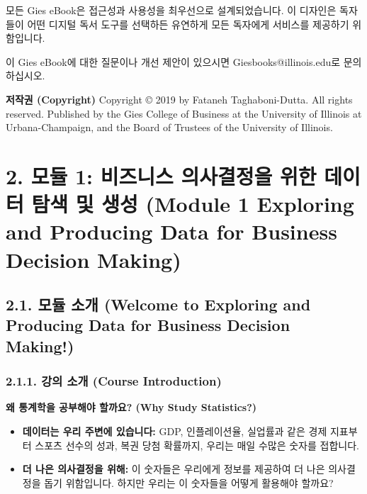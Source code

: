 \documentclass[11pt,a4paper]{article}
\theoremstyle{definition}
\begin{document}
모든 Gies eBook은 접근성과 사용성을 최우선으로 설계되었습니다. 이 디자인은 독자들이 어떤 디지털 독서 도구를 선택하든 유연하게 모든 독자에게 서비스를 제공하기 위함입니다.

이 Gies eBook에 대한 질문이나 개선 제안이 있으시면 Giesbooks@illinois.edu로 문의하십시오.

\textbf{저작권 (Copyright)}
Copyright © 2019 by Fataneh Taghaboni-Dutta. All rights reserved.
Published by the Gies College of Business at the University of Illinois at Urbana-Champaign, and the Board of Trustees of the University of Illinois.

\newpage
\section{2. 모듈 1: 비즈니스 의사결정을 위한 데이터 탐색 및 생성 (Module 1 Exploring and Producing Data for Business Decision Making)}

\subsection{2.1. 모듈 소개 (Welcome to Exploring and Producing Data for Business Decision Making!)}

\subsubsection{2.1.1. 강의 소개 (Course Introduction)}

\begin{examplebox}
\textbf{왜 통계학을 공부해야 할까요? (Why Study Statistics?)}
\begin{itemize}
    \item \textbf{데이터는 우리 주변에 있습니다:} GDP, 인플레이션율, 실업률과 같은 경제 지표부터 스포츠 선수의 성과, 복권 당첨 확률까지, 우리는 매일 수많은 숫자를 접합니다.
    \item \textbf{더 나은 의사결정을 위해:} 이 숫자들은 우리에게 정보를 제공하여 더 나은 의사결정을 돕기 위함입니다. 하지만 우리는 이 숫자들을 어떻게 활용해야 할까요?
\end{itemize}
\end{examplebox}
\end{document}
